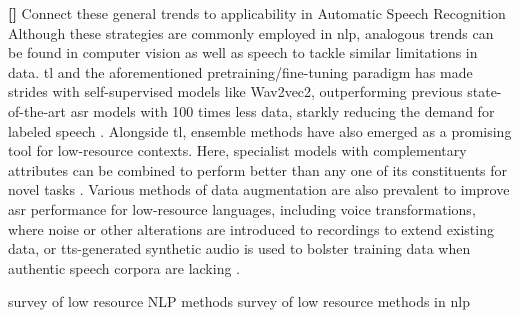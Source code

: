\documentclass[thesis]{cluu}
\newcounter{paranum}
\newcommand{\numberedparagraph}{\par\refstepcounter{paranum}\textbf{[\theparanum] }}
\begin{document}
\numberedparagraph{Connect these general trends to applicability in Automatic Speech Recognition}
Although these strategies are commonly employed in \gls{nlp}, analogous trends can be found in computer vision as well as speech to tackle similar limitations in data. \gls{tl} and the aforementioned pretraining/fine-tuning paradigm has made strides with self-supervised models like Wav2vec2, outperforming previous state-of-the-art \gls{asr} models with 100 times less data, starkly reducing the demand for labeled speech \parencite{baevskiWav2vec20Framework2020}. Alongside \gls{tl}, ensemble methods have also emerged as a promising tool for low-resource contexts. Here, specialist models with complementary attributes can be combined to perform better than any one of its constituents for novel tasks \parencite[inter alia]{arunkumarInvestigationEnsembleFeatures2022,dengEnsembleDeepLearning2014,gitmanConfidencebasedEnsemblesEndtoEnd2023,fiscus1997post}. Various methods of data augmentation are also prevalent to improve \gls{asr} performance for low-resource languages, including voice transformations, where noise or other alterations are introduced to recordings to extend existing data, or \gls{tts}-generated synthetic audio is used to bolster training data when authentic speech corpora are lacking \parencite{barteldsMakingMoreLittle2023,zhangL2GENNeuralPhoneme2022}.

\textcite{hedderichSurveyRecentApproaches2021} survey of low resource NLP methods
\textcite{magueresseLowresourceLanguagesReview2020} survey of low resource methods in \gls{nlp}
\end{document}
